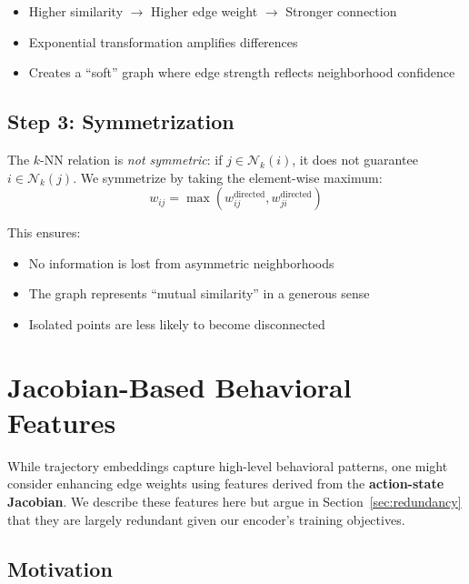 \documentclass[11pt,a4paper]{article}
\newcommand{\set}[1]{\mathcal{#1}}
\begin{document}
\begin{tcolorbox}[colback=green!5,colframe=green!40!black,title=Intuition: RBF Weighting]
\begin{itemize}
    \item Higher similarity $\rightarrow$ Higher edge weight $\rightarrow$ Stronger connection
    \item Exponential transformation amplifies differences
    \item Creates a ``soft'' graph where edge strength reflects neighborhood confidence
\end{itemize}
\end{tcolorbox}

\subsection{Step 3: Symmetrization}

The $k$-NN relation is \textit{not symmetric}: if $j \in \set{N}_k(i)$, it does not guarantee $i \in \set{N}_k(j)$. We symmetrize by taking the element-wise maximum:
\begin{equation}
    w_{ij} = \max(w_{ij}^{\text{directed}}, w_{ji}^{\text{directed}})
\end{equation}

This ensures:
\begin{itemize}
    \item No information is lost from asymmetric neighborhoods
    \item The graph represents ``mutual similarity'' in a generous sense
    \item Isolated points are less likely to become disconnected
\end{itemize}

\section{Jacobian-Based Behavioral Features}

While trajectory embeddings capture high-level behavioral patterns, one might consider enhancing edge weights using features derived from the \textbf{action-state Jacobian}. We describe these features here but argue in Section~\ref{sec:redundancy} that they are largely redundant given our encoder's training objectives.

\subsection{Motivation}
\end{document}
